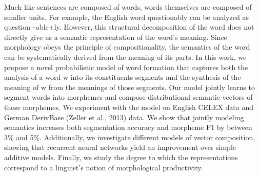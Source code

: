 Much like sentences are composed of words, words themselves are composed of smaller units. For example, the English word questionably can be analyzed as question+able+ly. However, this structural decomposition of the word does not directly give us a semantic representation of the word's meaning. Since morphology obeys the principle of compositionality, the semantics of the word can be systematically derived from the meaning of its parts. In this work, we propose a novel probabilistic model of word formation that captures both the analysis of a word w into its constituents segments and the synthesis of the meaning of w from the meanings of those segments. Our model jointly learns to segment words into morphemes and compose distributional semantic vectors of those morphemes. We experiment with the model on English CELEX data and German DerivBase (Zeller et al., 2013) data. We show that jointly modeling semantics increases both segmentation accuracy and morpheme F1 by between 3\% and 5\%. Additionally, we investigate different models of vector composition, showing that recurrent neural networks yield an improvement over simple additive models. Finally, we study the degree to which the representations correspond to a linguist's notion of morphological productivity.